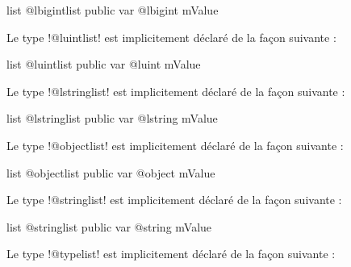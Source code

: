 \begin{galgasbox}
list @lbigintlist {
  public var @lbigint mValue
}
\end{galgasbox}











Le type \ggs!@luintlist! est implicitement déclaré de la façon suivante :

\begin{galgasbox}
list @luintlist {
  public var @luint mValue
}
\end{galgasbox}











Le type \ggs!@lstringlist! est implicitement déclaré de la façon suivante :

\begin{galgasbox}
list @lstringlist {
  public var @lstring mValue
}
\end{galgasbox}








Le type \ggs!@objectlist! est implicitement déclaré de la façon suivante :

\begin{galgasbox}
list @objectlist {
  public var @object mValue
}
\end{galgasbox}






Le type \ggs!@stringlist! est implicitement déclaré de la façon suivante :

\begin{galgasbox}
list @stringlist {
  public var @string mValue
}
\end{galgasbox}








Le type \ggs!@typelist! est implicitement déclaré de la façon suivante :

